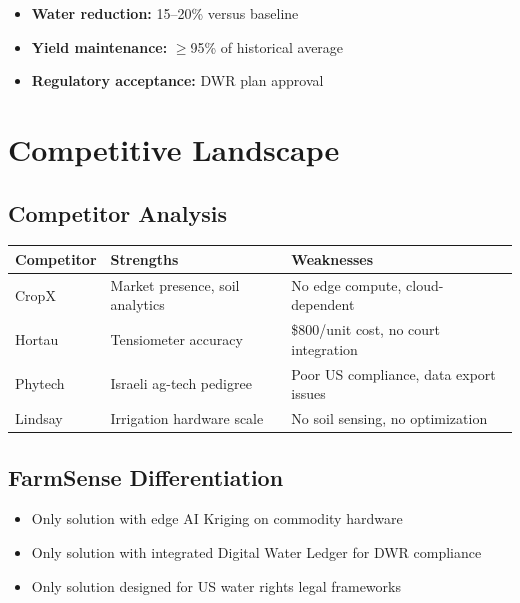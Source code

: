 \documentclass[10pt]{article}
\begin{document}
\begin{itemize}
    \item \textbf{Water reduction:} 15–20\% versus baseline
    \item \textbf{Yield maintenance:} $\geq$95\% of historical average
    \item \textbf{Regulatory acceptance:} DWR plan approval
\end{itemize}

\newpage

\section{Competitive Landscape}

\subsection{Competitor Analysis}

\begin{table}[h]
\centering
\small
\begin{tabular}{@{}lp{1.8in}p{1.8in}@{}}
\toprule
\textbf{Competitor} & \textbf{Strengths} & \textbf{Weaknesses} \\
\midrule
CropX & Market presence, soil analytics & No edge compute, cloud-dependent \\
Hortau & Tensiometer accuracy & \$800/unit cost, no court integration \\
Phytech & Israeli ag-tech pedigree & Poor US compliance, data export issues \\
Lindsay & Irrigation hardware scale & No soil sensing, no optimization \\
\bottomrule
\end{tabular}
\end{table}

\subsection{FarmSense Differentiation}

\begin{itemize}
    \item Only solution with edge AI Kriging on commodity hardware
    \item Only solution with integrated Digital Water Ledger for DWR compliance
    \item Only solution designed for US water rights legal frameworks
\end{itemize}
\end{document}
